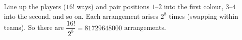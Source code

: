 Line up the players ($16!$ ways) and pair positions $1$--$2$ into the first colour, $3$--$4$ into the second, and so on. Each arrangement arises $2^8$ times (swapping within teams). So there are $\dfrac{16!}{2^8}=\boxed{81729648000}$ arrangements.
